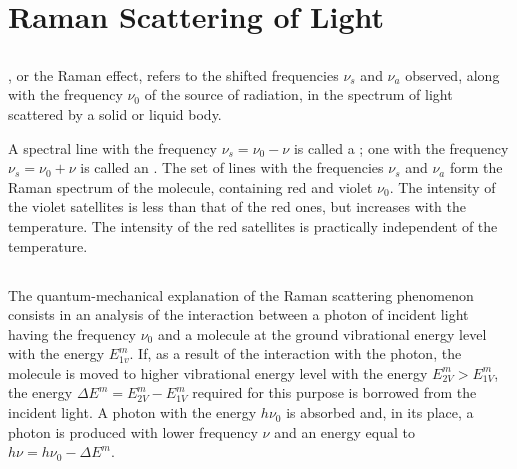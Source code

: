 \section{Raman Scattering of Light}
\label{sec-39.6} 

\subsection{}\label{39.6.1} , or the Raman effect, refers to the shifted frequencies $\nu_{s}$ and $\nu_{a}$ observed, along with the frequency $\nu_{0}$ of the source of radiation, in the spectrum of light scattered by a solid or liquid body. 

A spectral line with the frequency $\nu_{s} = \nu_{0} - \nu$ is called a ; one with the frequency $\nu_{s} = \nu_{0} + \nu$ is called an . The set of lines with the frequencies $\nu_{s}$ and $\nu_{a}$ form the Raman spectrum of the molecule, containing red and violet  $\nu_{0}$. The intensity of the violet satellites is less than that of the red ones, but increases with the temperature. The intensity of the red satellites is practically independent of the temperature.

\subsection{}\label{39.6.2} The quantum-mechanical explanation of the Raman scattering phenomenon consists in an analysis of the interaction between a photon of incident light having the frequency $\nu_{0}$ and a molecule at the ground vibrational energy level with the energy $E^{m}_{1v}$. If, as a result of the interaction with the photon, the molecule is moved to higher vibrational energy level with the energy $E^{m}_{2V} > E^{m}_{1V}$, the energy $\Delta E^{m} = E^{m}_{2V} - E^{m}_{1V}$ required for this purpose is borrowed from the incident light. A photon with the energy $h \nu_{0}$ is absorbed and, in its place, a photon is produced with lower frequency $\nu$ and an energy equal to $h \nu = h \nu_{0} - \Delta E^{m}$.


